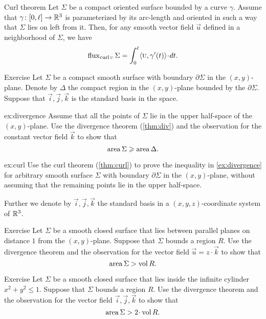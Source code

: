 \begin{thm}{Curl theorem}\label{thm:curl}
Let $\Sigma$ be a compact oriented surface bounded by a curve $\gamma$.
Assume that $\gamma\colon[0,\ell]\to \mathbb{R}^3$ is parameterized by its arc-length and oriented in such a way that $\Sigma$ lies on left from it.
Then, for any smooth vector field $\vec u$ defined in a neighborhood of $\Sigma$, we have
\[\flux_{\curl\vec u}\Sigma
=
\int_0^\ell\langle\vec u,\gamma'(t)\rangle\cdot dt.\]

\end{thm}


\begin{thm}{Exercise}\label{ex:divergence-1}
Let $\Sigma$ be a compact smooth surface with boundary $\partial \Sigma$ in the $(x,y)$-plane.
Denote by $\Delta$ the compact region in the $(x,y)$-plane bounded by the $\partial \Sigma$.
Suppose that $\vec i,\vec j,\vec k$ is the standard basis in the space.

\begin{subthm}{ex:divergence}
Assume that all the points of $\Sigma$ lie in the upper half-space of the $(x,y)$-plane.
Use the divergence theorem (\ref{thm:div}) and the observation for the constant vector field $\vec k$
to show that 
\[\mathop{\rm area}\nolimits\Sigma\geqslant\mathop{\rm area}\nolimits\Delta.\]
\end{subthm}

\begin{subthm}{ex:curl} 
Use the curl theorem (\ref{thm:curl}) to prove the inequality in \ref{ex:divergence} for arbitrary smooth surface $\Sigma$ with boundary $\partial \Sigma$ in the $(x,y)$-plane, without assuming that the remaining points lie in the upper half-space.
\end{subthm}

\end{thm}

Further we denote by $\vec i,\vec j,\vec k$ the standard basis in a $(x,y,z)$-coordinate system of $\mathbb{R}^3$.

\begin{thm}{Exercise}\label{ex:divergence-2}
Let $\Sigma$ be a smooth closed surface that lies between parallel planes on distance $1$ from the $(x,y)$-plane.
Suppose that $\Sigma$ bounds a region $R$.
Use the divergence theorem and the observation for the vector field $\vec u=z\cdot \vec k$ to  show that 
\[\mathop{\rm area}\nolimits \Sigma>\mathop{\rm vol}\nolimits R.\]
\end{thm}

\begin{thm}{Exercise}
Let $\Sigma$ be a smooth closed surface that lies inside the infinite cylinder $x^2+y^2\le 1$.
Suppose that $\Sigma$ bounds a region $R$.
Use the divergence theorem and the observation for the vector field $\vec i,\vec j,\vec k$ to show that  
\[\area \Sigma>2\cdot\vol R.\]
\end{thm}

